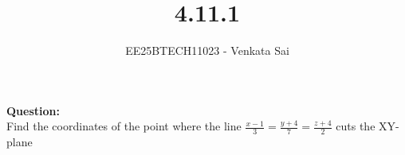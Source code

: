 \documentclass[journal]{IEEEtran}
\begin{document}


\title{4.11.1}
\author{EE25BTECH11023 - Venkata Sai}
{\let\newpage\relax\maketitle}

\renewcommand{\thefigure}{\theenumi}
\renewcommand{\thetable}{\theenumi}
\setlength{\intextsep}{10pt} %


\renewcommand{\thetable}{\theenumi}

\textbf{Question:}  \\
Find the coordinates of the point where the line  $\frac{x-1}{3} = \frac{y+4}{7} = \frac{z+4}{2}$ cuts the XY-plane 
\end{document}
